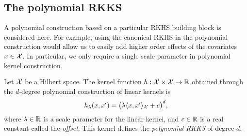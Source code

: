 
\subsection{The polynomial RKKS}

A polynomial construction based on a particular RKHS building block is considered here.
For example, using the canonical RKHS in the polynomial construction would allow us to easily add higher order effects of the covariates $x \in {\mathcal X}$.
In particular, we only require a single scale parameter in polynomial kernel construction.

\begin{definition}
  Let ${\mathcal X}$ be a Hilbert space.
  The kernel function $h:{\mathcal X}\times{\mathcal X}\to\mathbb{R}$ obtained through the $d$-degree polynomial construction of linear kernels is
  \[
    h_\lambda(x,x') = \big(\lambda\langle x,x'\rangle_{\mathcal X} + c\big)^d,
  \]
  where $\lambda \in \mathbb{R}$ is a scale parameter for the linear kernel, and $c \in \mathbb{R}$ is a real constant called the \emph{offset}.
  This kernel defines the \emph{polynomial RKKS} of degree $d$.
\end{definition}

